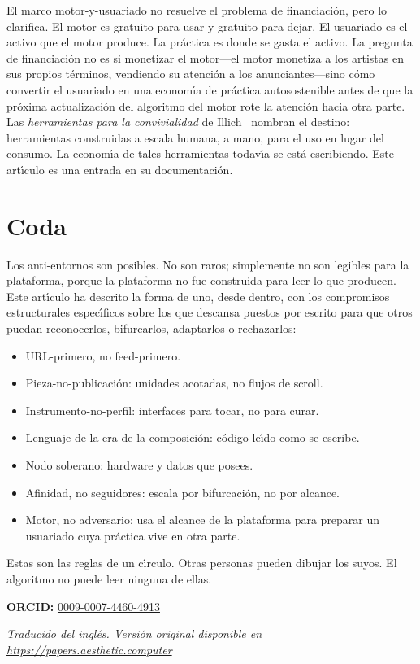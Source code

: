 \documentclass[10pt,letterpaper,twocolumn]{article}
\begin{document}
El marco motor-y-usuariado no resuelve el problema de financiaci\'{o}n, pero lo clarifica. El motor es gratuito para usar y gratuito para dejar. El usuariado es el activo que el motor produce. La pr\'{a}ctica es donde se gasta el activo. La pregunta de financiaci\'{o}n no es si monetizar el motor---el motor monetiza a los artistas en sus propios t\'{e}rminos, vendiendo su atenci\'{o}n a los anunciantes---sino c\'{o}mo convertir el usuariado en una econom\'{\i}a de pr\'{a}ctica autosostenible antes de que la pr\'{o}xima actualizaci\'{o}n del algoritmo del motor rote la atenci\'{o}n hacia otra parte. Las \emph{herramientas para la convivialidad} de Illich~\citep{illich1973tools} nombran el destino: herramientas construidas a escala humana, a mano, para el uso en lugar del consumo. La econom\'{\i}a de tales herramientas todav\'{\i}a se est\'{a} escribiendo. Este art\'{\i}culo es una entrada en su documentaci\'{o}n.

\section{Coda}

Los anti-entornos son posibles. No son raros; simplemente no son legibles para la plataforma, porque la plataforma no fue construida para leer lo que producen. Este art\'{\i}culo ha descrito la forma de uno, desde dentro, con los compromisos estructurales espec\'{\i}ficos sobre los que descansa puestos por escrito para que otros puedan reconocerlos, bifurcarlos, adaptarlos o rechazarlos:

\begin{itemize}
  \item URL-primero, no feed-primero.
  \item Pieza-no-publicaci\'{o}n: unidades acotadas, no flujos de scroll.
  \item Instrumento-no-perfil: interfaces para tocar, no para curar.
  \item Lenguaje de la era de la composici\'{o}n: c\'{o}digo le\'{\i}do como se escribe.
  \item Nodo soberano: hardware y datos que posees.
  \item Afinidad, no seguidores: escala por bifurcaci\'{o}n, no por alcance.
  \item Motor, no adversario: usa el alcance de la plataforma para preparar un usuariado cuya pr\'{a}ctica vive en otra parte.
\end{itemize}

Estas son las reglas de un c\'{\i}rculo. Otras personas pueden dibujar los suyos. El algoritmo no puede leer ninguna de ellas.

\vspace{0.5em}
\noindent\textbf{ORCID:} \href{https://orcid.org/0009-0007-4460-4913}{0009-0007-4460-4913}

\vspace{0.5em}
\noindent\textit{Traducido del ingl\'{e}s. Versi\'{o}n original disponible en \url{https://papers.aesthetic.computer}}



\end{document}

